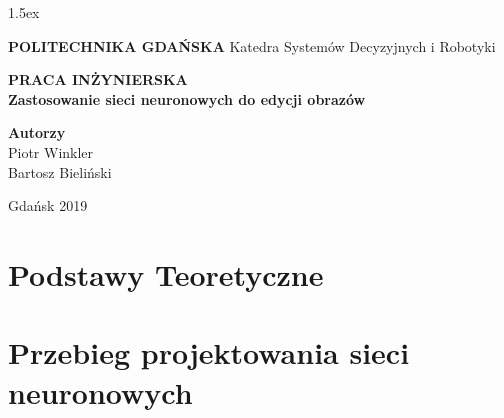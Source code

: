 \documentclass[10pt]{article}
\begin{document}
\parskip 1.5ex %

\baselineskip=15pt  %
\linespread{1.3} %



\begin{titlepage}
  \begin{center}

    \vspace*{1cm}
    \Huge
    \textbf{POLITECHNIKA GDAŃSKA}
    \newline
    \vspace{0.5cm}
    \LARGE
    Katedra Systemów Decyzyjnych i Robotyki

    \vspace{1.5cm}
    \textbf{PRACA INŻYNIERSKA}
    \\[0.5cm]
    \textbf{Zastosowanie sieci neuronowych do edycji obrazów}

    \vspace{2.5cm}
    \Large
    \textbf{Autorzy}\\
    Piotr Winkler\\
    Bartosz Bieliński

    \vspace{3.5cm}
    Gdańsk 2019

  \end{center}
\end{titlepage}

\setcounter{page}{2}






\newpage
  \tableofcontents



\section{Podstawy Teoretyczne}



\section{Przebieg projektowania sieci neuronowych}
\end{document}
